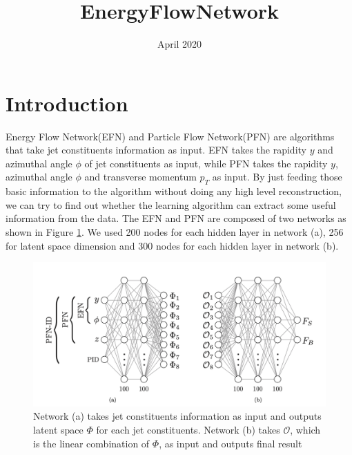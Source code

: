 \documentclass{article}
\title{EnergyFlowNetwork}
\author{}
\date{April 2020}
\begin{document}
\maketitle

\section{Introduction}
Energy Flow Network(EFN) and Particle Flow Network(PFN) are algorithms that take jet constituents information as input. EFN takes the rapidity ${y}$ and azimuthal angle ${\phi}$ of jet constituents as input, while PFN takes the rapidity $y$, azimuthal angle $\phi$ and transverse momentum $p_{T}$ as input. 
By just feeding those basic information to the algorithm without doing any high level reconstruction, we can try to find out whether the learning algorithm can extract some useful information from the data.
The EFN and PFN are composed of two networks as shown in Figure \ref{fig:EFNArch}. 
We used 200 nodes for each hidden layer in network (a), 256 for latent space dimension and 300 nodes for each hidden layer in network (b). 

\begin{figure}[h!]
\centering
\includegraphics[scale=0.5]{EFNArch.png}
\caption{Network (a) takes jet constituents information as input and outputs latent space $\Phi$ for each jet constituents. Network (b) takes $\mathcal{O}$, which is the linear combination of $\Phi$, as input and outputs final result}
\label{fig:EFNArch}
\end{figure}
\end{document}
